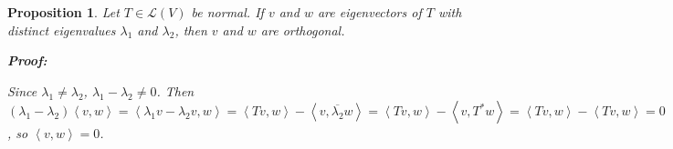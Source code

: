 \documentclass{article}
\theoremstyle{colontheorem}
\newtheorem{proposition}[theorem]{Proposition}
\newenvironment{Proposition}
{
	\begin{mdframed}[backgroundcolor=TheoremOrange!10]
	\begin{proposition}
}
{
	\end{proposition}
	\end{mdframed}
	
	\vspace{.15in}
}
\newenvironment{Proof}
{
	\begin{mdframed}[backgroundcolor=ProofPurple!10]
	\textbf{Proof:}%
}
{
	\end{mdframed}
	
	\vspace{.085in}
}
\begin{document}
\begin{Proposition}
	
	Let $T \in \mathcal{L}(V)$ be normal. If $v$ and $w$ are eigenvectors of $T$ with distinct eigenvalues $\lambda_1$ and $\lambda_2$, then $v$ and $w$ are orthogonal.
	
	\begin{Proof}
		Since $\lambda_1 \neq \lambda_2$, $\lambda_1 - \lambda_2 \neq 0$. Then $(\lambda_1 - \lambda_2) \left< v, w \right> = \left< \lambda_1 v - \lambda_2 v, w \right> = \left< Tv, w \right> - \left< v, \overline{\lambda_2} w \right> = \left< Tv, w \right> - \left< v, T^* w \right> = \left< Tv, w \right> - \left< Tv, w \right> = 0$, so $\left< v, w \right> = 0$.
		
	\end{Proof}
	
\end{Proposition}
\end{document}
